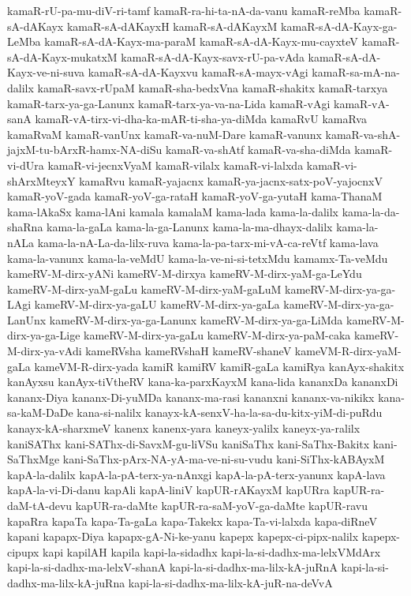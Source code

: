 {kamaR-rU-pa-mu-diV-ri-tamf
kamaR-ra-hi-ta-nA-da-vanu
kamaR-reMba
kamaR-sA-dAKayx
kamaR-sA-dAKayxH
kamaR-sA-dAKayxM
kamaR-sA-dA-Kayx-ga-LeMba
kamaR-sA-dA-Kayx-ma-paraM
kamaR-sA-dA-Kayx-mu-cayxteV
kamaR-sA-dA-Kayx-mukatxM
kamaR-sA-dA-Kayx-savx-rU-pa-vAda
kamaR-sA-dA-Kayx-ve-ni-suva
kamaR-sA-dA-Kayxvu
kamaR-sA-mayx-vAgi
kamaR-sa-mA-na-dalilx
kamaR-savx-rUpaM
kamaR-sha-bedxVna
kamaR-shakitx
kamaR-tarxya
kamaR-tarx-ya-ga-Lanunx
kamaR-tarx-ya-va-na-Lida
kamaR-vAgi
kamaR-vA-sanA
kamaR-vA-tirx-vi-dha-ka-mAR-ti-sha-ya-diMda
kamaRvU
kamaRva
kamaRvaM
kamaR-vanUnx
kamaR-va-nuM-Dare
kamaR-vanunx
kamaR-va-shA-jajxM-tu-bArxR-hamx-NA-diSu
kamaR-va-shAtf
kamaR-va-sha-diMda
kamaR-vi-dUra
kamaR-vi-jecnxVyaM
kamaR-vilalx
kamaR-vi-lalxda
kamaR-vi-shArxMteyxY
kamaRvu
kamaR-yajacnx
kamaR-ya-jacnx-satx-poV-yajocnxV
kamaR-yoV-gada
kamaR-yoV-ga-rataH
kamaR-yoV-ga-yutaH
kama-ThanaM
kama-lAkaSx
kama-lAni
kamala
kamalaM
kama-lada
kama-la-dalilx
kama-la-da-shaRna
kama-la-gaLa
kama-la-ga-Lanunx
kama-la-ma-dhayx-dalilx
kama-la-nALa
kama-la-nA-La-da-lilx-ruva
kama-la-pa-tarx-mi-vA-ca-reVtf
kama-lava
kama-la-vanunx
kama-la-veMdU
kama-la-ve-ni-si-tetxMdu
kamamx-Ta-veMdu
kameRV-M-dirx-yANi
kameRV-M-dirxya
kameRV-M-dirx-yaM-ga-LeYdu
kameRV-M-dirx-yaM-gaLu
kameRV-M-dirx-yaM-gaLuM
kameRV-M-dirx-ya-ga-LAgi
kameRV-M-dirx-ya-gaLU
kameRV-M-dirx-ya-gaLa
kameRV-M-dirx-ya-ga-LanUnx
kameRV-M-dirx-ya-ga-Lanunx
kameRV-M-dirx-ya-ga-LiMda
kameRV-M-dirx-ya-ga-Lige
kameRV-M-dirx-ya-gaLu
kameRV-M-dirx-ya-paM-caka
kameRV-M-dirx-ya-vAdi
kameRVsha
kameRVshaH
kameRV-shaneV
kameVM-R-dirx-yaM-gaLa
kameVM-R-dirx-yada
kamiR
kamiRV
kamiR-gaLa
kamiRya
kanAyx-shakitx
kanAyxsu
kanAyx-tiVtheRV
kana-ka-parxKayxM
kana-lida
kananxDa
kananxDi
kananx-Diya
kananx-Di-yuMDa
kananx-ma-rasi
kananxni
kananx-va-nikikx
kana-sa-kaM-DaDe
kana-si-nalilx
kanayx-kA-senxV-ha-la-sa-du-kitx-yiM-di-puRdu
kanayx-kA-sharxmeV
kanenx
kanenx-yara
kaneyx-yalilx
kaneyx-ya-ralilx
kaniSAThx
kani-SAThx-di-SavxM-gu-liVSu
kaniSaThx
kani-SaThx-Bakitx
kani-SaThxMge
kani-SaThx-pArx-NA-yA-ma-ve-ni-su-vudu
kani-SiThx-kABAyxM
kapA-la-dalilx
kapA-la-pA-terx-ya-nAnxgi
kapA-la-pA-terx-yanunx
kapA-lava
kapA-la-vi-Di-danu
kapAli
kapA-liniV
kapUR-rAKayxM
kapURra
kapUR-ra-daM-tA-devu
kapUR-ra-daMte
kapUR-ra-saM-yoV-ga-daMte
kapUR-ravu
kapaRra
kapaTa
kapa-Ta-gaLa
kapa-Takekx
kapa-Ta-vi-lalxda
kapa-diRneV
kapani
kapapx-Diya
kapapx-gA-Ni-ke-yanu
kapepx
kapepx-ci-pipx-nalilx
kapepx-cipupx
kapi
kapilAH
kapila
kapi-la-sidadhx
kapi-la-si-dadhx-ma-lelxVMdArx
kapi-la-si-dadhx-ma-lelxV-shanA
kapi-la-si-dadhx-ma-lilx-kA-juRnA
kapi-la-si-dadhx-ma-lilx-kA-juRna
kapi-la-si-dadhx-ma-lilx-kA-juR-na-deVvA
}
